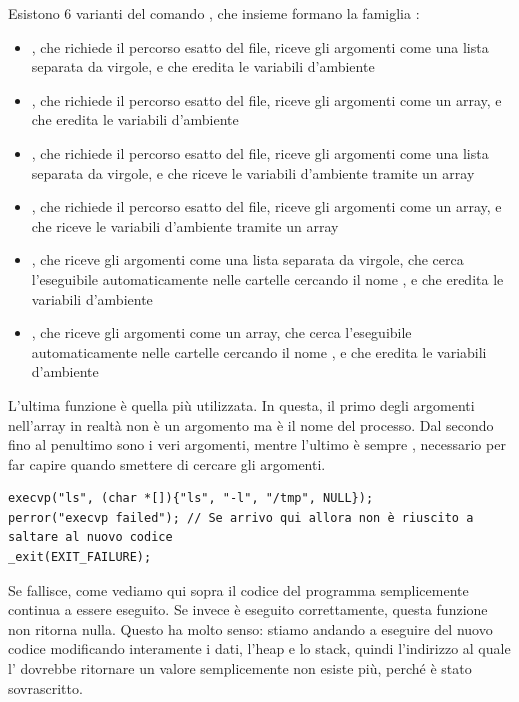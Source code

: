 \documentclass[11pt, a4paper, titlepage, oneside]{scrbook}
\begin{document}
Esistono 6 varianti del comando , che insieme formano la famiglia :
\begin{itemize}
    \item {}, che richiede il percorso esatto del file, riceve gli argomenti come una lista separata da virgole, e che eredita le variabili d'ambiente
    \item {}, che richiede il percorso esatto del file, riceve gli argomenti come un array, e che eredita le variabili d'ambiente
    \item {}, che richiede il percorso esatto del file, riceve gli argomenti come una lista separata da virgole, e che riceve le variabili d'ambiente tramite un array
    \item {}, che richiede il percorso esatto del file, riceve gli argomenti come un array, e che riceve le variabili d'ambiente tramite un array
    \item {}, che riceve gli argomenti come una lista separata da virgole, che cerca l'eseguibile automaticamente nelle cartelle cercando il nome , e che eredita le variabili d'ambiente
    \item {}, che riceve gli argomenti come un array, che cerca l'eseguibile automaticamente nelle cartelle cercando il nome , e che eredita le variabili d'ambiente
\end{itemize}

L'ultima funzione è quella più utilizzata. In questa, il primo degli argomenti nell'array  in realtà non è un argomento ma è il nome del processo. Dal secondo fino al penultimo sono i veri argomenti, mentre l'ultimo è sempre , necessario per far capire quando smettere di cercare gli argomenti.

\begin{lstlisting}[style=C]
execvp("ls", (char *[]){"ls", "-l", "/tmp", NULL});
perror("execvp failed"); // Se arrivo qui allora non è riuscito a saltare al nuovo codice
_exit(EXIT_FAILURE);
\end{lstlisting}

Se  fallisce, come vediamo qui sopra il codice del programma semplicemente continua a essere eseguito. Se invece è eseguito correttamente, questa funzione non ritorna nulla. Questo ha molto senso: stiamo andando a eseguire del nuovo codice modificando interamente i dati, l'heap e lo stack, quindi l'indirizzo al quale l' dovrebbe ritornare un valore semplicemente non esiste più, perché è stato sovrascritto.
\end{document}
